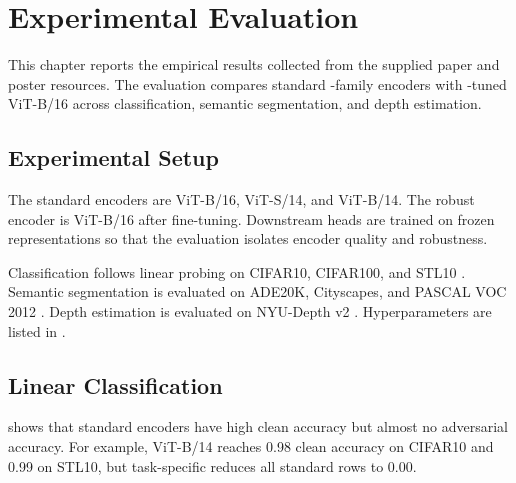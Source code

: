 \chapter{Experimental Evaluation}
\label{chap:evaluation}

This chapter reports the empirical results collected from the supplied paper and poster resources. The evaluation compares standard \DINO-family encoders with \DeACL-tuned \DINO ViT-B/16 across classification, semantic segmentation, and depth estimation.

\section{Experimental Setup}

The standard encoders are \DINO ViT-B/16, \DINOv ViT-S/14, and \DINOv ViT-B/14. The robust encoder is \DINO ViT-B/16 after \DeACL fine-tuning. Downstream heads are trained on frozen representations so that the evaluation isolates encoder quality and robustness.

Classification follows linear probing on CIFAR10, CIFAR100, and STL10 \parencite{krizhevsky2009learning,coates2011analysis}. Semantic segmentation is evaluated on ADE20K, Cityscapes, and PASCAL VOC 2012 \parencite{ADE1,ADE2,Cordts2016cityScapes,Everingham10pascalVoc}. Depth estimation is evaluated on NYU-Depth v2 \parencite{Silberman2012NYU}. Hyperparameters are listed in .

\section{Linear Classification}

 shows that standard encoders have high clean accuracy but almost no adversarial accuracy. For example, \DINOv ViT-B/14 reaches 0.98 clean accuracy on CIFAR10 and 0.99 on STL10, but task-specific \PGD reduces all standard rows to 0.00.

